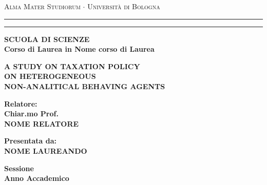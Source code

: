 
\begin{titlepage}
    \textwidth=450pt\oddsidemargin=0pt
    \begin{center}
    {{\Large{\textsc{Alma Mater Studiorum $\cdot$ Universit\`a di
    Bologna}}}} 
    \rule[0.1cm]{15.8cm}{0.1mm}
    \rule[0.5cm]{15.8cm}{0.6mm}
    {\small{\bf SCUOLA DI SCIENZE\\
    Corso di Laurea in Nome corso di Laurea }}
    \end{center}
    \vspace{15mm}
    \begin{center}
    {\Large{\bf A STUDY ON TAXATION POLICY}}\\
    \vspace{3mm}
    {\Large{\bf   ON HETEROGENEOUS }}\\
    \vspace{3mm}
    {\Large{\bf NON-ANALITICAL BEHAVING AGENTS}}\\
    \end{center}
    \vspace{40mm}
    \par
    \noindent
    \begin{minipage}[t]{0.47\textwidth}
    {\large{\bf Relatore:\\
    Chiar.mo Prof.\\
    NOME RELATORE}}
    \end{minipage}
    \hfill
    \begin{minipage}[t]{0.47\textwidth}\raggedleft
    {\large{\bf Presentata da:\\
    NOME LAUREANDO}}
    \end{minipage}
    \vspace{20mm}
    \begin{center}
    {\large{\bf Sessione\\%
    Anno Accademico }}%
    \end{center}
    \end{titlepage}